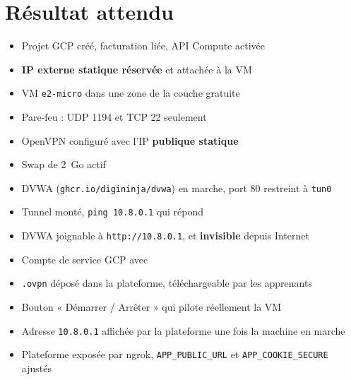 \documentclass[a4paper,12pt]{article}
\begin{document}
\section{Résultat attendu}

\begin{itemize}[label=$\checkmark$]
    \item Projet GCP créé, facturation liée, API Compute activée
    \item \textbf{IP externe statique réservée} et attachée à la VM
    \item VM \texttt{e2-micro} dans une zone de la couche gratuite
    \item Pare-feu : UDP 1194 et TCP 22 seulement
    \item OpenVPN configuré avec l'IP \textbf{publique statique}
    \item Swap de 2~Go actif
    \item DVWA (\texttt{ghcr.io/digininja/dvwa}) en marche, port 80 restreint à \texttt{tun0}
    \item Tunnel monté, \texttt{ping 10.8.0.1} qui répond
    \item DVWA joignable à \texttt{http://10.8.0.1}, et \textbf{invisible} depuis Internet
    \item Compte de service GCP avec 
    \item \texttt{.ovpn} déposé dans la plateforme, téléchargeable par les apprenants
    \item Bouton « Démarrer / Arrêter » qui pilote réellement la VM
    \item Adresse \texttt{10.8.0.1} affichée par la plateforme une fois la machine en marche
    \item Plateforme exposée par ngrok, \texttt{APP\_PUBLIC\_URL} et
          \texttt{APP\_COOKIE\_SECURE} ajustés
\end{itemize}
\end{document}
